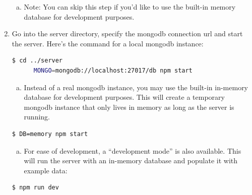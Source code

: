 \documentclass[onecolumn]{IEEEtran}
\begin{document}
\begin{enumerate}
    \begin{enumerate}[(a)]
        \item Note: You can skip this step if you’d like to use the built-in memory database for development purposes. 
    \end{enumerate}
    \item Go into the server directory, specify the mongodb connection url and start the server. Here’s the command for a local mongodb instance:
    \begin{lstlisting}[language=bash]
    $ cd ../server 
      MONGO=mongodb://localhost:27017/db npm start
    \end{lstlisting}
    \begin{enumerate}[(a)]
        \item Instead of a real mongodb instance, you may use the built-in in-memory database for development purposes. This will create a temporary mongodb instance that only lives in memory as long as the server is running.
    \end{enumerate}
    \begin{lstlisting}[language=bash]
    $ DB=memory npm start
    \end{lstlisting}
    \begin{enumerate}[(b)]
        \item For ease of development, a “development mode” is also available. This will run the server with an in-memory database and populate it with example data:
    \end{enumerate}
    \begin{lstlisting}[language=bash]
    $ npm run dev
    \end{lstlisting}
\end{enumerate}
\end{document}
